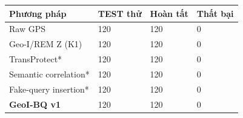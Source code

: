 \par\smallskip\noindent\begin{tabularx}{\linewidth}{@{}P{4cm}XXX@{}}\toprule
\textbf{Phương pháp} & \textbf{TEST thử} & \textbf{Hoàn tất} & \textbf{Thất bại} \\
\midrule
Raw GPS & 120 & 120 & 0 \\
Geo-I/REM Z (K1) & 120 & 120 & 0 \\
TransProtect* & 120 & 120 & 0 \\
Semantic correlation* & 120 & 120 & 0 \\
Fake-query insertion* & 120 & 120 & 0 \\
\textbf{GeoI-BQ v1} & 120 & 120 & 0 \\
\bottomrule\end{tabularx}\par\smallskip
